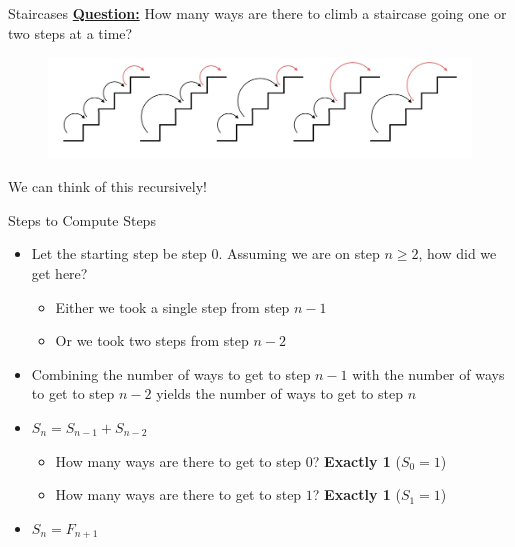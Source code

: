 \documentclass[aspectratio=169]{beamer}
\begin{document}
\begin{frame}{Staircases}
    \underline{\textbf{Question:}} How many ways are there to climb a staircase going one or two steps at a time?
    \begin{figure}
        \centering
        \includegraphics[scale=0.9]{images/staircase_red.png}
    \end{figure}
    We can think of this recursively!
\end{frame}

\begin{frame}{Steps to Compute Steps}
    \begin{itemize}
        \item Let the starting step be step $0$. Assuming we are on step $n \geq 2$, how did we get here? \pause
        \begin{itemize}
            \item Either we took a single step from step $n - 1$ \pause
            \item Or we took two steps from step $n - 2$ \pause
        \end{itemize}
        \item Combining the number of ways to get to step $n - 1$ with the number of ways to get to step $n - 2$ yields the number of ways to get to step $n$ \pause
        \item $S_n = S_{n - 1} + S_{n - 2}$ \pause
        \begin{itemize}
            \item How many ways are there to get to step $0$? \textbf{Exactly 1} ($S_0 = 1$) \pause
            \item How many ways are there to get to step $1$? \textbf{Exactly 1} ($S_1 = 1$) \pause
        \end{itemize}
        \item $S_n = F_{n + 1}$
    \end{itemize}
\end{frame}
\end{document}
